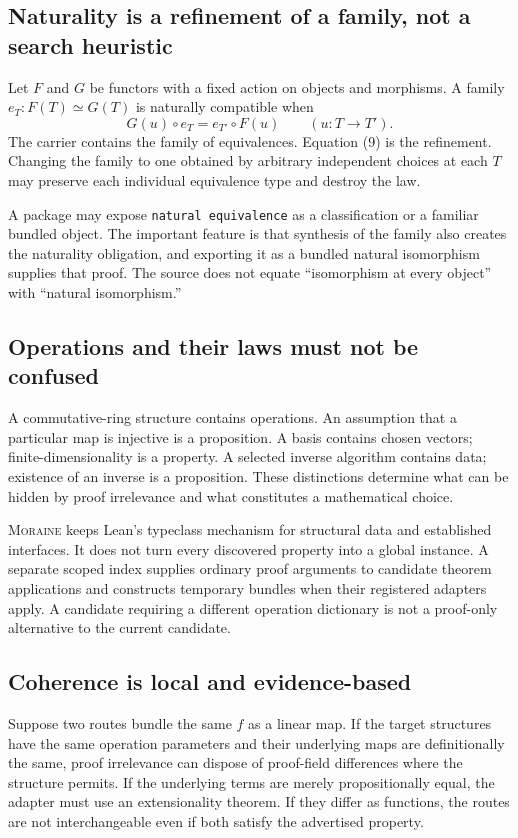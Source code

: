 \documentclass[11pt,letterpaper]{article}
\newcommand{\code}[1]{\nolinkurl{#1}}
\newcommand{\moraine}{\textsc{Moraine}}
\theoremstyle{definition}
\theoremstyle{remark}
\begin{document}
\subsection{Naturality is a refinement of a family, not a search heuristic}
Let $F$ and $G$ be functors with a fixed action on objects and morphisms. A family
$e_T:F(T)\simeq G(T)$ is naturally compatible when
\[
G(u)\circ e_T=e_{T'}\circ F(u)
\qquad(u:T\to T').
\tag{9}
\]
The carrier contains the family of equivalences. Equation (9) is the refinement.
Changing the family to one obtained by arbitrary independent choices at each
$T$ may preserve each individual equivalence type and destroy the law.

A package may expose \code{natural equivalence} as a classification or a familiar
bundled object. The important feature is that synthesis of the family also
creates the naturality obligation, and exporting it as a bundled natural
isomorphism supplies that proof. The source does not equate ``isomorphism at
every object'' with ``natural isomorphism.''

\subsection{Operations and their laws must not be confused}
A commutative-ring structure contains operations. An assumption that a
particular map is injective is a proposition. A basis contains chosen vectors;
finite-dimensionality is a property. A selected inverse algorithm contains
data; existence of an inverse is a proposition. These distinctions determine
what can be hidden by proof irrelevance and what constitutes a mathematical
choice.

\moraine{} keeps Lean's typeclass mechanism for structural data and established
interfaces. It does not turn every discovered property into a global instance.
A separate scoped index supplies ordinary proof arguments to candidate theorem
applications and constructs temporary bundles when their registered adapters
apply. A candidate requiring a different operation dictionary is not a
proof-only alternative to the current candidate.

\subsection{Coherence is local and evidence-based}
Suppose two routes bundle the same $f$ as a linear map. If the target structures
have the same operation parameters and their underlying maps are definitionally
the same, proof irrelevance can dispose of proof-field differences where the
structure permits. If the underlying terms are merely propositionally equal,
the adapter must use an extensionality theorem. If they differ as functions, the
routes are not interchangeable even if both satisfy the advertised property.
\end{document}
